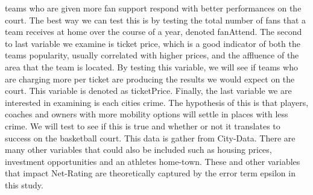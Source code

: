 \documentclass[12pt,english]{article}
\begin{document}
teams who are given more fan support respond with better performances on the court. The best way we can test this is by testing the total number of fans that a team receives at home over the course of a year, denoted fanAttend. The second to last variable we examine is ticket price, which is a good indicator of both the teams popularity, usually correlated with higher prices, and the affluence of the area that the team is located. By testing this variable, we will see if teams who are charging more per ticket are producing the results we would expect on the court. This variable is denoted as ticketPrice. Finally, the last variable we are interested in examining is each cities crime. The hypothesis of this is that players, coaches and owners with more mobility options will settle in places with less crime. We will test to see if this is true and whether or not it translates to success on the basketball court. This data is gather from City-Data.
There are many other variables that could also be included such as housing prices, investment opportunities and an athletes home-town. These and other variables that impact Net-Rating are theoretically captured by the error term epsilon in this study. 
\end{document}
